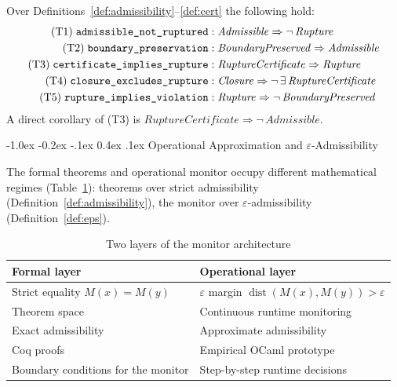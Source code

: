 \documentclass{llncs}
\makeatletter
\renewcommand\subsection{\@startsection{subsection}{2}{\z@}%
  {-1.0ex \@plus -0.2ex \@minus -.1ex}%
  {0.4ex \@plus .1ex}%
  {\normalfont\normalsize\bfseries}}
\DeclareMathOperator{\dist}{dist}
\makeatother
\begin{document}
\begin{theorem}
\label{thm:coq}
\label{thm:anr}\label{lem:cir}\label{thm:cer}
Over Definitions~\ref{def:admissibility}--\ref{def:cert} the following
hold:
\begin{align*}
\textrm{(T1)\;}\texttt{admissible\_not\_ruptured}:\;
    &\mathit{Admissible} \Rightarrow \neg\,\mathit{Rupture} \\
\textrm{(T2)\;}\texttt{boundary\_preservation}:\;
    &\mathit{BoundaryPreserved} \Rightarrow \mathit{Admissible} \\
\textrm{(T3)\;}\texttt{certificate\_implies\_rupture}:\;
    &\mathit{RuptureCertificate} \Rightarrow \mathit{Rupture} \\
\textrm{(T4)\;}\texttt{closure\_excludes\_rupture}:\;
    &\mathit{Closure} \Rightarrow \neg\,\exists\,\mathit{RuptureCertificate} \\
\textrm{(T5)\;}\texttt{rupture\_implies\_violation}:\;
    &\mathit{Rupture} \Rightarrow \neg\,\mathit{BoundaryPreserved}
\end{align*}
A direct corollary of \textrm{(T3)} is $\mathit{RuptureCertificate}
\Rightarrow \neg\,\mathit{Admissible}$.
\end{theorem}

\subsection{Operational Approximation and $\varepsilon$-Admissibility}
\label{sec:opapprox}

The formal theorems and operational monitor occupy different
mathematical regimes (Table~\ref{tab:layers}): theorems over strict
admissibility (Definition~\ref{def:admissibility}), the monitor over
$\varepsilon$-admissibility (Definition~\ref{def:eps}).

\begin{table}[H]
\centering
\caption{Two layers of the monitor architecture}
\label{tab:layers}
\small
\begin{tabular}{ll}
\toprule
\textbf{Formal layer} & \textbf{Operational layer} \\
\midrule
Strict equality $M(x) = M(y)$       & $\varepsilon$ margin $\dist(M(x),M(y)) > \varepsilon$ \\
Theorem space                       & Continuous runtime monitoring \\
Exact admissibility                 & Approximate admissibility \\
Coq proofs                          & Empirical OCaml prototype \\
Boundary conditions for the monitor & Step-by-step runtime decisions \\
\bottomrule
\end{tabular}
\end{table}
\end{document}
